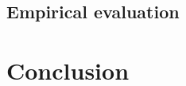 \documentclass[nobib, a4paper, 10pt, oneside, onecolumn, openany, notitlepage, final,
svgnames, marginals=raggedouter, english,
]{article}
\begin{document}
\subsection{Empirical evaluation}
\label{sub:gtx_empirical_evaluation}

% 

\section{Conclusion}


\begingroup
\small
{}
\todos

\setlength\bibitemsep{2pt}
\printbibliography
\endgroup

% 
% 
\end{document}
